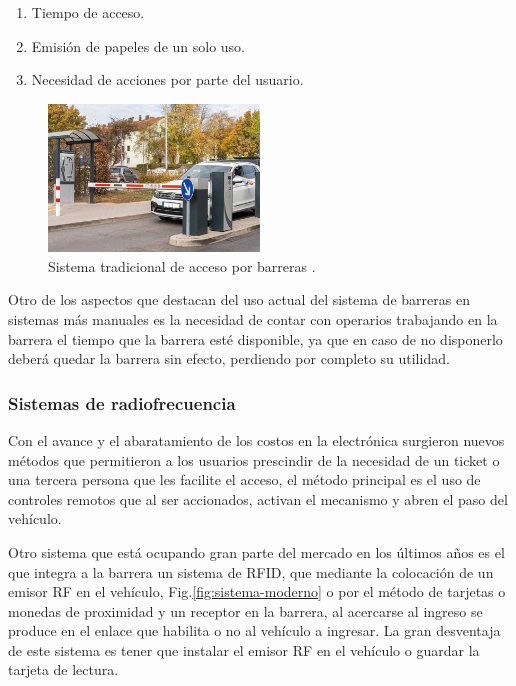 \begin{enumerate}
    \item Tiempo de acceso.
    \item Emisión de papeles de un solo uso.
    \item Necesidad de acciones por parte del usuario.
\end{enumerate}

\begin{figure}
    \centering
    \includegraphics[width=0.5\textwidth]{imgs/sistema-control-acceso-barreras.jpg}
    \caption{Sistema tradicional de acceso por barreras \cite{integralia_sistema_2019}.}
    \label{fig:sistema-tradicional}
\end{figure}

Otro de los aspectos que destacan del uso actual del sistema de barreras en sistemas más manuales es la necesidad de
contar con  operarios trabajando en la barrera el tiempo que la barrera esté disponible, ya que en caso de no disponerlo
deberá quedar la barrera sin efecto, perdiendo por completo su utilidad.

\subsubsection*{Sistemas de radiofrecuencia}

Con el avance y el abaratamiento de los costos en la electrónica surgieron nuevos métodos que permitieron a los usuarios prescindir de la necesidad de un ticket o una tercera persona que les facilite el acceso, el método principal es el uso de controles remotos que al ser accionados, activan el mecanismo y abren el paso del vehículo.

Otro sistema que está ocupando gran parte del mercado en los últimos años es el que integra a la barrera un sistema de RFID, que mediante la colocación de un emisor RF en el vehículo, Fig.\ref{fig:sistema-moderno} o por el método de tarjetas o monedas de proximidad y un receptor en la barrera, al acercarse al ingreso se produce en el enlace que habilita o no al vehículo a ingresar. La gran desventaja de este sistema es tener que instalar el emisor RF en el vehículo o guardar la tarjeta de lectura.


